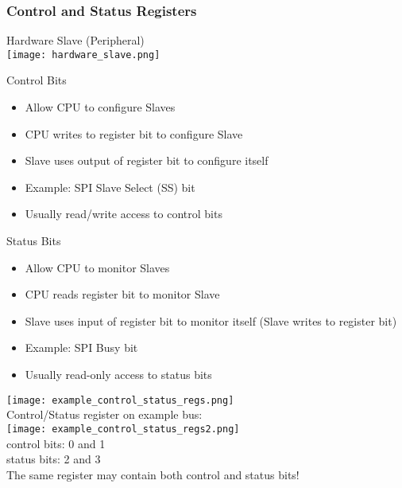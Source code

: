 \subsubsection{Control and Status Registers}

\begin{definition}{Hardware Slave (Peripheral)}\\
    \texttt{[image: hardware\_slave.png]}
\end{definition}


\begin{concept}{Control Bits}
    \begin{itemize}
        \item Allow CPU to configure Slaves
        \item CPU writes to register bit to configure Slave
        \item Slave uses output of register bit to configure itself
        \item Example: SPI Slave Select (SS) bit
        \item Usually read/write access to control bits
    \end{itemize}
\end{concept}

\begin{concept}{Status Bits}
    \begin{itemize}
        \item Allow CPU to monitor Slaves
        \item CPU reads register bit to monitor Slave
        \item Slave uses input of register bit to monitor itself (Slave writes to register bit)
        \item Example: SPI Busy bit
        \item Usually read-only access to status bits
    \end{itemize}
\end{concept}

\multend

\begin{example}
\texttt{[image: example\_control\_status\_regs.png]}\\
Control/Status register on example bus:\\
\texttt{[image: example\_control\_status\_regs2.png]}\\
control bits: 0 and 1\\
status bits: 2 and 3\\
The same register may contain both control and status bits!
\end{example}

